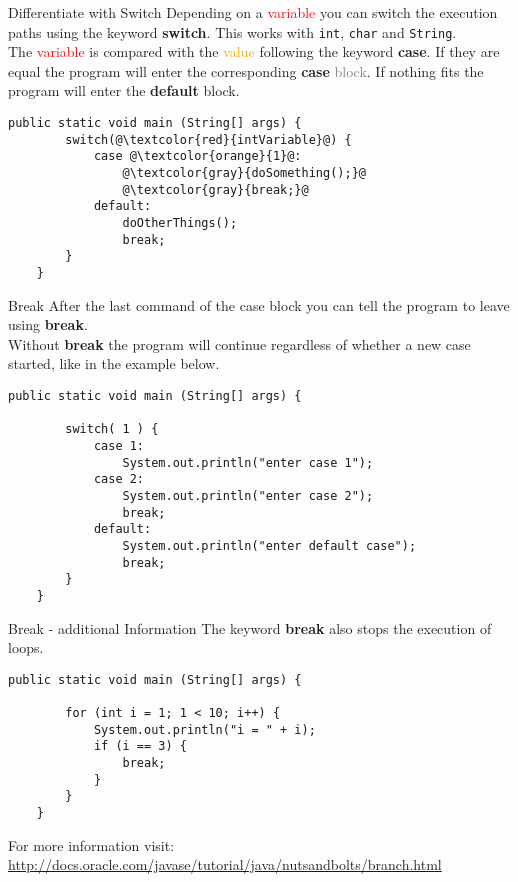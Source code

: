 \begin{frame}[fragile]{Differentiate with Switch}
	Depending on a \textcolor{red}{variable} you can switch the execution paths using the keyword \textbf{switch}.
	This works with \texttt{int}, \texttt{char} and \texttt{String}. \\
	\vfill
	The \textcolor{red}{variable} is compared 
	with the \textcolor{orange}{value} following the keyword \textbf{case}.
	If they are equal the program will enter the corresponding \textbf{case} \textcolor{gray}{block}.
	If nothing fits the program will enter the \textbf{default} block.
	\begin{lstlisting}[basicstyle=\ttfamily\scriptsize]
	public static void main (String[] args) {
	    switch(@\textcolor{red}{intVariable}@) {
	        case @\textcolor{orange}{1}@:
	            @\textcolor{gray}{doSomething();}@
	            @\textcolor{gray}{break;}@
	        default:
	            doOtherThings();
	            break;
	    }
	}
	\end{lstlisting}
\end{frame}
\begin{frame}[fragile]{Break}
	After the last command of the case block	you can tell the program to leave using \textbf{break}.\\
	Without \textbf{break} the program will continue regardless of
	whether a new case started, like in the example below.
	\begin{lstlisting}[basicstyle=\ttfamily\scriptsize]
	public static void main (String[] args) {
	
	    switch( 1 ) {
	        case 1:
	            System.out.println("enter case 1");
	        case 2:
	            System.out.println("enter case 2");
	            break;
	        default:
	            System.out.println("enter default case");
	            break;
	    }
	}
	\end{lstlisting}
\end{frame}

\begin{frame}[fragile]{Break - additional Information}
	The keyword \textbf{break} also stops the execution of loops.
	\begin{lstlisting}[basicstyle=\ttfamily\scriptsize]
	public static void main (String[] args) {
	
	    for (int i = 1; 1 < 10; i++) {
	        System.out.println("i = " + i);
	        if (i == 3) {
	            break;
	        }
	    }
	}
	\end{lstlisting}
	For more information visit:\\
	\scriptsize\url{http://docs.oracle.com/javase/tutorial/java/nutsandbolts/branch.html}
\end{frame}

